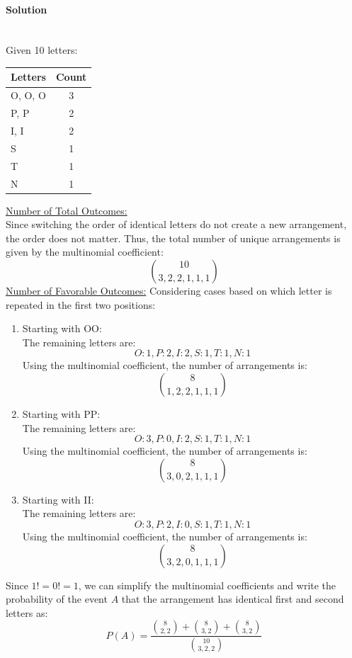 ﻿\documentclass[12pt]{article}
\begin{document}
\begin{enumerate}[label=(\alph*), leftmargin=*]
\paragraph{Solution}\mbox{}\\
Given 10 letters:
\begin{center}
\renewcommand{\arraystretch}{1.5}
\begin{tabular}{lc}
\toprule
\textbf{Letters} & \textbf{Count} \\
\midrule
O, O, O & 3 \\
P, P & 2 \\
I, I & 2 \\
S & 1 \\
T & 1 \\
N & 1 \\
\bottomrule
\end{tabular}
\end{center}
\underline{Number of Total Outcomes:}\\
Since switching the order of identical letters do not create a new arrangement, the order does not matter. Thus, the total number of unique arrangements is given by the multinomial coefficient:
\[\binom{10}{3,2,2,1,1,1}\]
\underline{Number of Favorable Outcomes:}
Considering cases based on which letter is repeated in the first two positions:
\begin{enumerate}
    \item[(1)] Starting with OO:\\
    The remaining letters are:
    \[O:1, P:2, I:2, S:1, T:1, N:1\]
    Using the multinomial coefficient, the number of arrangements is:
    \[\binom{8}{1,2,2,1,1,1}\]
    \item[(2)] Starting with PP:\\
    The remaining letters are:
    \[O:3, P:0, I:2, S:1, T:1, N:1\]
    Using the multinomial coefficient, the number of arrangements is:
    \[\binom{8}{3,0,2,1,1,1}\]
    \item[(3)] Starting with II:\\
    The remaining letters are:
    \[O:3, P:2, I:0, S:1, T:1, N:1\]
    Using the multinomial coefficient, the number of arrangements is:
    \[\binom{8}{3,2,0,1,1,1}\]
\end{enumerate}
Since $1!=0!=1$, we can simplify the multinomial coefficients and write the probability of the event $A$ that the arrangement has identical first and second letters as:
\[\boxed{P(A) = \frac{\binom{8}{2,2}+\binom{8}{3,2}+\binom{8}{3,2}}{\binom{10}{3,2,2}}}\]

\end{enumerate}
\end{document}
